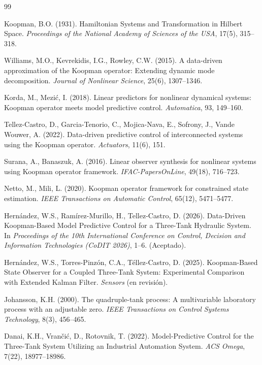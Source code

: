 \documentclass[12pt,letterpaper]{article}
\begin{document}
\begin{thebibliography}{99}

Koopman, B.O. (1931). Hamiltonian Systems and Transformation in 
Hilbert Space. \textit{Proceedings of the National Academy of 
Sciences of the USA}, 17(5), 315--318.

Williams, M.O., Kevrekidis, I.G., Rowley, C.W. (2015). A data-driven 
approximation of the Koopman operator: Extending dynamic mode 
decomposition. \textit{Journal of Nonlinear Science}, 25(6), 
1307--1346.

Korda, M., Mezić, I. (2018). Linear predictors for nonlinear dynamical 
systems: Koopman operator meets model predictive control. 
\textit{Automatica}, 93, 149--160.

Tellez-Castro, D., Garcia-Tenorio, C., Mojica-Nava, E., Sofrony, J., 
Vande Wouwer, A. (2022). Data-driven predictive control of 
interconnected systems using the Koopman operator. \textit{Actuators}, 
11(6), 151.

Surana, A., Banaszuk, A. (2016). Linear observer synthesis for 
nonlinear systems using Koopman operator framework. 
\textit{IFAC-PapersOnLine}, 49(18), 716--723.

Netto, M., Mili, L. (2020). Koopman operator framework for constrained 
state estimation. \textit{IEEE Transactions on Automatic Control}, 
65(12), 5471--5477.

Hernández, W.S., Ramírez-Murillo, H., Tellez-Castro, D. (2026). 
Data-Driven Koopman-Based Model Predictive Control for a Three-Tank 
Hydraulic System. In \textit{Proceedings of the 10th International 
Conference on Control, Decision and Information Technologies 
(CoDIT 2026)}, 1--6. (Aceptado).

Hernández, W.S., Torres-Pinzón, C.A., Téllez-Castro, D. (2025). 
Koopman-Based State Observer for a Coupled Three-Tank System: 
Experimental Comparison with Extended Kalman Filter. \textit{Sensors} 
(en revisión).

Johansson, K.H. (2000). The quadruple-tank process: A multivariable 
laboratory process with an adjustable zero. \textit{IEEE Transactions 
on Control Systems Technology}, 8(3), 456--465.

Danai, K.H., Vrančić, D., Rotovnik, T. (2022). Model-Predictive 
Control for the Three-Tank System Utilizing an Industrial Automation 
System. \textit{ACS Omega}, 7(22), 18977--18986.


\end{thebibliography}
\end{document}
